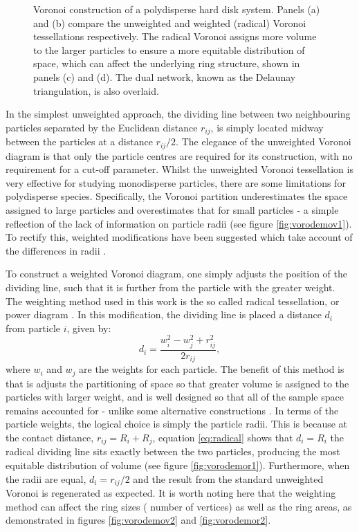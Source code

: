 \begin{figure}[b]
     \caption{Voronoi construction of a polydisperse hard disk system. Panels (a) and (b) compare the unweighted and weighted (radical) Voronoi tessellations respectively. The radical Voronoi assigns more volume to the larger particles to ensure a more equitable distribution of space, which can affect the underlying ring structure, shown in panels (c) and (d). The dual network, known as the Delaunay triangulation, is also overlaid.}
     \label{fig:vorodemo}
\end{figure}

In the simplest unweighted approach, the dividing line between two neighbouring particles separated by the Euclidean distance $r_{ij}$, is simply located midway between the particles at a distance $r_{ij} /2$. 
The elegance of the unweighted Voronoi diagram is that only the particle centres are required for its construction, with no requirement for a cut\--off parameter. 
Whilst the unweighted Voronoi tessellation is very effective for studying monodisperse particles, there are some limitations for polydisperse species. 
Specifically, the Voronoi partition underestimates the space assigned to large particles and overestimates that for small particles \-- a simple reflection of the lack of information on particle radii  (see figure \ref{fig:vorodemov1}). 
To rectify this, weighted modifications have been suggested which take account of the differences in radii \cite{Poupon2004}.

To construct a weighted Voronoi diagram, one simply adjusts the position of the dividing line, such that it is further from the particle with the greater weight. 
The weighting method used in this work is the so called radical tessellation, or power diagram \cite{GELLATLY1982,Aurenhammer1987}. In this modification, the dividing line is placed a distance $d_i$ from particle $i$, given by:
\begin{equation}
	\label{eq:radical}
	d_i = \frac{w_i^2-w_j^2+r_{ij}^2}{2r_{ij}},
\end{equation}
where $w_i$ and $w_j$ are the weights for each particle. 
The benefit of this method is that is adjusts the partitioning of space so that greater volume is assigned to the particles with larger weight, and is well designed so that all of the sample space remains accounted for \-- unlike some alternative constructions \cite{Richards1974}. 
In terms of the particle weights, the logical choice is simply the particle radii. 
This is because at the contact distance, $r_{ij} = R_i + R_j$, equation \eqref{eq:radical} shows that $d_i = R_i$ \ie{} the radical dividing line sits exactly between the two particles, producing the most equitable distribution of volume (see figure \ref{fig:vorodemor1}). 
Furthermore, when the radii are equal, $d_i = r_{ij} /2$ and the result from the standard unweighted Voronoi is regenerated as expected.
It is worth noting here that the weighting method can affect the ring sizes (\ie{} number of vertices) as well as the ring areas, as demonstrated in figures \ref{fig:vorodemov2} and \ref{fig:vorodemor2}.

